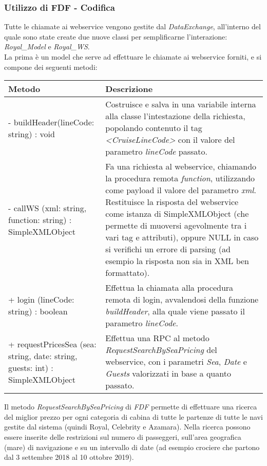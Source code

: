 \subsubsection{Utilizzo di FDF - Codifica}
Tutte le chiamate ai \gls{webservice} vengono gestite dal \textit{DataExchange}, all'interno del quale sono state create due nuove classi per semplificarne l'interazione: \textit{Royal\_Model} e \textit{Royal\_WS}.\\
La prima è un model che serve ad effettuare le chiamate ai \gls{webservice} forniti, e si compone dei seguenti metodi:
\begin{center}
	\def\arraystretch{1.5}
	\begin{longtable}{ >{\raggedright}p{5.5cm} p{6.8cm}} 
		\hline
		\textbf{Metodo} & \textbf{Descrizione} \\
		\hline
		- buildHeader(lineCode: string) : void & Costruisce e salva in una variabile interna alla classe l'intestazione della richiesta, popolando contenuto il tag \textit{<CruiseLineCode>} con il valore del parametro \textit{lineCode} passato.\\
		\hline
		- callWS (xml: string, function: string) : SimpleXMLObject & Fa una richiesta al \gls{webservice}, chiamando la procedura remota \textit{function}, utilizzando come payload il valore del parametro \textit{xml}. Restituisce la risposta del \gls{webservice} come istanza di SimpleXMLObject (che permette di muoversi agevolmente tra i vari tag e attributi), oppure NULL in caso si verifichi un errore di parsing (ad esempio la risposta non sia in XML ben formattato).\\
		\hline
		+ login (lineCode: string) : boolean & Effettua la chiamata alla procedura remota di login, avvalendosi della funzione \textit{buildHeader}, alla quale viene passato il parametro \textit{lineCode}.\\
		\hline
		+ requestPricesSea (sea: string, date: string, guests: int) : SimpleXMLObject & Effettua una \gls{RPC} al metodo \textit{RequestSearchBySeaPricing} del \gls{webservice}, con i parametri \textit{Sea}, \textit{Date} e \textit{Guests} valorizzati in base a quanto passato.\\
		\hline
	\end{longtable}
\end{center}
Il metodo \textit{RequestSearchBySeaPricing} di \textit{FDF} permette di effettuare una ricerca del miglior prezzo per ogni categoria di cabina di tutte le partenze di tutte le navi gestite dal sistema (quindi Royal, Celebrity e Azamara). Nella ricerca possono essere inserite delle restrizioni sul numero di passeggeri, sull'area geografica (mare) di navigazione e su un intervallo di date (ad esempio crociere che partono dal 3 settembre 2018 al 10 ottobre 2019). \\
